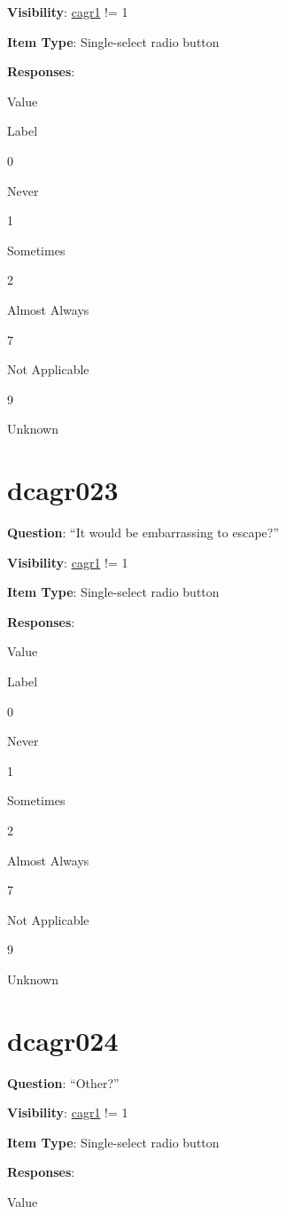 \documentclass[]{book}
\begin{document}
\textbf{Visibility}: \protect\hyperlink{cagr1}{cagr1} != 1

\textbf{Item Type}: Single-select radio button

\textbf{Responses}:

Value

Label

0

Never

1

Sometimes

2

Almost Always

7

Not Applicable

9

Unknown

\hypertarget{dcagr023}{%
\section{dcagr023}\label{dcagr023}}

\textbf{Question}: ``It would be embarrassing to escape?''

\textbf{Visibility}: \protect\hyperlink{cagr1}{cagr1} != 1

\textbf{Item Type}: Single-select radio button

\textbf{Responses}:

Value

Label

0

Never

1

Sometimes

2

Almost Always

7

Not Applicable

9

Unknown

\hypertarget{dcagr024}{%
\section{dcagr024}\label{dcagr024}}

\textbf{Question}: ``Other?''

\textbf{Visibility}: \protect\hyperlink{cagr1}{cagr1} != 1

\textbf{Item Type}: Single-select radio button

\textbf{Responses}:

Value
\end{document}
